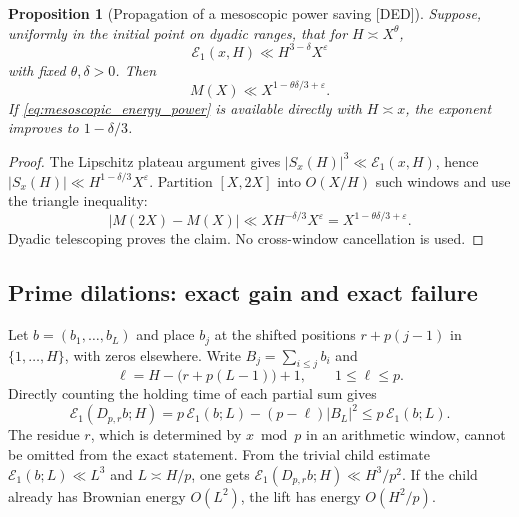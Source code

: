 \documentclass[11pt]{amsart}
\numberwithin{equation}{section}
\theoremstyle{plain}
\newtheorem{proposition}[theorem]{Proposition}
\theoremstyle{definition}
\theoremstyle{remark}
\newcommand{\Mert}{M}
\newcommand{\eps}{\varepsilon}
\begin{document}
\begin{proposition}[Propagation of a mesoscopic power saving
\textnormal{[DED]}]
\label{prop:mesoscopic_power_propagation}
Suppose, uniformly in the initial point on dyadic ranges, that for
$H\asymp X^\theta$,
\begin{equation}
 \mathcal E_1(x,H)\ll H^{3-\delta}X^\eps
\label{eq:mesoscopic_energy_power}
\end{equation}
with fixed $\theta,\delta>0$.  Then
\begin{equation}
 \Mert(X)\ll X^{1-\theta\delta/3+\eps}.
\label{eq:mesoscopic_energy_global_power}
\end{equation}
If \eqref{eq:mesoscopic_energy_power} is available directly with $H\asymp x$,
the exponent improves to $1-\delta/3$.
\end{proposition}

\begin{proof}
The Lipschitz plateau argument gives
$|S_x(H)|^3\ll\mathcal E_1(x,H)$, hence
$|S_x(H)|\ll H^{1-\delta/3}X^\eps$.  Partition $[X,2X]$ into
$O(X/H)$ such windows and use the triangle inequality:
\begin{equation}
 |\Mert(2X)-\Mert(X)|
 \ll XH^{-\delta/3}X^\eps
 =X^{1-\theta\delta/3+\eps}.
\end{equation}
Dyadic telescoping proves the claim.  No cross-window cancellation is used.
\end{proof}

\subsection{Prime dilations: exact gain and exact failure}
\label{subsec:prime_dilation_gain_failure}

Let $b=(b_1,\ldots,b_L)$ and place $b_j$ at the shifted positions
$r+p(j-1)$ in $\{1,\ldots,H\}$, with zeros elsewhere.  Write
$B_j=\sum_{i\leq j}b_i$ and
\begin{equation}
 \ell=H-\bigl(r+p(L-1)\bigr)+1,\qquad1\leq\ell\leq p.
\end{equation}
Directly counting the holding time of each partial sum gives
\begin{equation}
 \boxed{\;
 \mathcal E_1(D_{p,r}b;H)
 =p\,\mathcal E_1(b;L)-(p-\ell)|B_L|^2
 \leq p\,\mathcal E_1(b;L).\;}
\label{eq:shifted_prime_dilation_energy}
\end{equation}
The residue $r$, which is determined by $x\bmod p$ in an arithmetic window,
cannot be omitted from the exact statement.  From the trivial child estimate
$\mathcal E_1(b;L)\ll L^3$ and $L\asymp H/p$, one gets
$\mathcal E_1(D_{p,r}b;H)\ll H^3/p^2$.  If the child already has Brownian
energy $O(L^2)$, the lift has energy $O(H^2/p)$.
\end{document}
